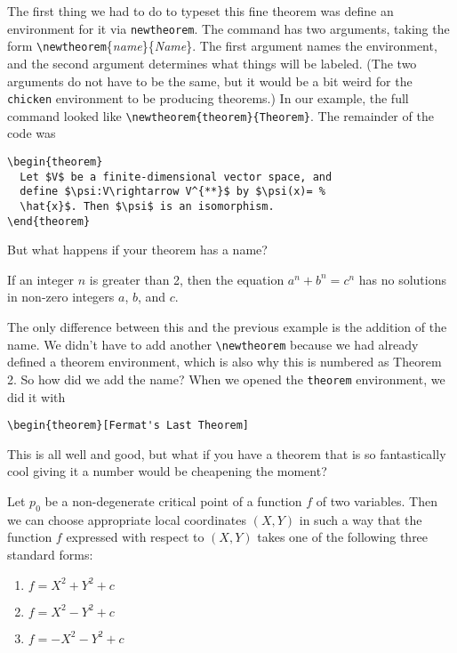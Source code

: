 The first thing we had to do to typeset this fine theorem was define
an environment for it via \texttt{newtheorem}.  The command has two
arguments, taking the form
\verb|\newtheorem|\{\textit{name}\}\{\textit{Name}\}.  The first argument
names the environment, and the second argument determines what things
will be labeled.  (The two arguments do not have to be the same, but
it would be a bit weird for the \texttt{chicken} environment to be
producing theorems.)  In our example, the full command looked like
\verb|\newtheorem{theorem}{Theorem}|.  The remainder of the code was
\begin{verbatim}
\begin{theorem}
  Let $V$ be a finite-dimensional vector space, and
  define $\psi:V\rightarrow V^{**}$ by $\psi(x)= %
  \hat{x}$. Then $\psi$ is an isomorphism.
\end{theorem}
\end{verbatim}
But what happens if your theorem has a name?
\begin{theorem}
  If an integer $n$ is greater than 2, then the equation $a^n + b^n =
  c^n$ has no solutions in non-zero integers $a$, $b$, and $c$.
\end{theorem}

The only difference between this and the previous example is the
addition of the name.  We didn't have to add another
\verb|\newtheorem| because we had already defined a theorem
environment, which is also why this is numbered as Theorem 2.  So how
did we add the name?  When we opened the \texttt{theorem} environment,
we did it with
\begin{verbatim}
\begin{theorem}[Fermat's Last Theorem]
\end{verbatim}
This is all well and good, but what if you have a theorem that is so
fantastically cool giving it a number would be cheapening the moment?
\begin{morse}
  Let $p_0$ be a non-degenerate critical point of a function $f$ of
  two variables.  Then we can choose appropriate local coordinates
  $(X,Y)$ in such a way that the function $f$ expressed with respect
  to $(X,Y)$ takes one of the following three standard forms:
  \begin{enumerate}
  \item $f=X^2+Y^2+c$
  \item $f=X^2-Y^2+c$
  \item $f=-X^2-Y^2+c$
  \end{enumerate}
\end{morse}

